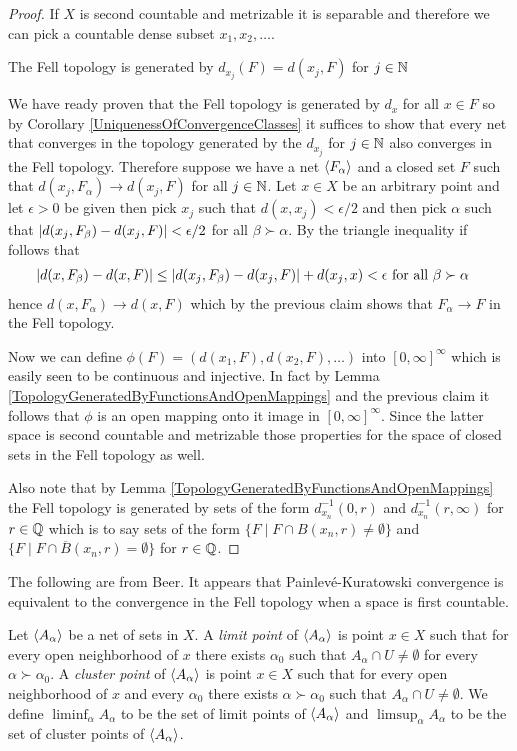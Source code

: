 \begin{proof}
If $X$ is second countable and metrizable it is separable and therefore we can pick a countable dense subset $x_1, x_2, \dotsc$.  
\begin{clm} The Fell topology is generated by $d_{x_j}(F) = d(x_j,F)$ for $j \in \mathbb{N}$
\end{clm}
We have ready proven that the Fell topology is generated by $d_x$ for all $x \in F$ so by Corollary \ref{UniquenessOfConvergenceClasses} it suffices to show that every net that converges in the
topology generated by the $d_{x_j}$ for $j \in \mathbb{N}$ also converges in the Fell topology.  Therefore suppose we have a net $\langle F_{\alpha} \rangle$ and a closed set $F$ such that $d(x_j, F_\alpha) \to d(x_j,F)$ for all $j \in \mathbb{N}$.  Let $x \in X$ be an arbitrary point and let $\epsilon > 0$ be given then pick $x_j$ such that $d(x,x_j) < \epsilon/2$ and then pick $\alpha$ such that
$\left \vert d(x_j, F_\beta) - d(x_j, F) \right \vert < \epsilon/2$ for all $\beta \succ \alpha$.  By the triangle inequality if follows that 
\begin{align*}
\left \vert d(x, F_\beta) - d(x, F) \right \vert &\leq \left \vert d(x_j, F_\beta) - d(x_j, F) \right \vert + d(x_j,x) < \epsilon \text{ for all $\beta \succ \alpha$}
\end{align*}
hence $d(x, F_\alpha) \to d(x,F)$ which by the previous claim shows that $F_\alpha \to F$ in the Fell topology.

Now we can define $\phi(F) = (d(x_1, F), d(x_2, F), \dotsc)$ into $[0,\infty]^\infty$ which is easily seen to be continuous and injective.  In fact by Lemma \ref{TopologyGeneratedByFunctionsAndOpenMappings} and the previous claim it follows that $\phi$ is an open mapping onto it image in $[0,\infty]^\infty$.  Since the latter space is second countable and metrizable those properties for the space of closed sets in the Fell topology as well.

Also note that by Lemma \ref{TopologyGeneratedByFunctionsAndOpenMappings}  the Fell topology is generated by sets of the form $d_{x_n}^{-1}(0,r)$ and $d_{x_n}^{-1}(r, \infty)$ for $r \in \mathbb{Q}$ which is to say sets of the form $\lbrace F \mid F \cap B(x_n,r) \neq \emptyset \rbrace$ and $\lbrace F \mid F \cap \overline{B}(x_n,r) = \emptyset \rbrace$ for $r \in \mathbb{Q}$.
\end{proof}


The following are from Beer.   It appears that Painlev\'{e}-Kuratowski convergence is equivalent to the convergence in the Fell topology when a space is first countable.

\begin{defn}Let $\langle A_{\alpha} \rangle$ be a net of sets in $X$.  A \emph{limit point} of $\langle A_{\alpha} \rangle$ is point $x \in X$ such that for every open neighborhood of $x$ there exists $\alpha_0$ such that $A_\alpha \cap U \neq \emptyset$ for every $\alpha \succ \alpha_0$. A \emph{cluster point} of $\langle A_{\alpha} \rangle$ is point $x \in X$ such that for every open neighborhood of $x$ and every $\alpha_0$ there exists $\alpha \succ \alpha_0$ such that $A_\alpha \cap U \neq \emptyset$.   We define $\liminf_\alpha A_\alpha$ to be the set of limit points of  $\langle A_{\alpha} \rangle$ and $\limsup_\alpha A_\alpha$ to be the set of cluster points of  $\langle A_{\alpha} \rangle$.
\end{defn}

